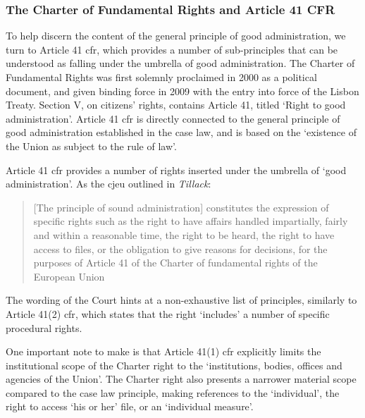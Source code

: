 \subsubsection{The Charter of Fundamental Rights and Article 41 CFR}
\label{sec:ch2-cfr-art41}

To help discern the content of the general principle of good administration, we turn to Article 41 \gls{cfr}, which provides a number of sub-principles that can be understood as falling under the umbrella of good administration.
\autocites[75--76]{mihaescu-evansRightGoodAdministration2015}[127]{Tillack}
The Charter of Fundamental Rights was first solemnly proclaimed in 2000 as a political document,\autocite[27--28]{fraHandbookDataprotection2018} and given binding force in 2009 with the entry into force of the Lisbon Treaty.\autocite[6(1)]{TEU}
Section V, on citizens' rights, contains Article 41, titled `Right to good administration'.\autocite[41]{CFR}
Article 41 \gls{cfr} is directly connected to the general principle of good administration established in the case law, and is based on the `existence of the Union as subject to the rule of law'.\autocite[Explanation on Article 41]{ExplanationsCFR}

Article 41 \gls{cfr} provides a number of rights inserted under the umbrella of `good administration'.
As the \gls{cjeu} outlined in \emph{Tillack}:

\begin{quote}
    [The principle of sound administration] constitutes the expression of specific rights such as the right to have affairs handled impartially, fairly and within a reasonable time, the right to be heard, the right to have access to files, or the obligation to give reasons for decisions, for the purposes of Article 41 of the Charter of fundamental rights of the European Union\autocite[127]{Tillack}
\end{quote}

The wording of the Court hints at a non-exhaustive list of principles,\autocite[91--92]{hofmannEvansRelationCharterFundamental2013} similarly to Article 41(2) \gls{cfr}, which states that the right `includes' a number of specific procedural rights.\autocite[41(2)]{CFR}

One important note to make is that Article 41(1) \gls{cfr} explicitly limits the institutional scope of the Charter right to the `institutions, bodies, offices and agencies of the Union'.\autocite[41(1)]{CFR}
The Charter right also presents a narrower material scope compared to the case law principle, making references to the `individual', the right to access `his or her' file, or an `individual measure'.\autocite[86--87]{hofmannEvansRelationCharterFundamental2013}

